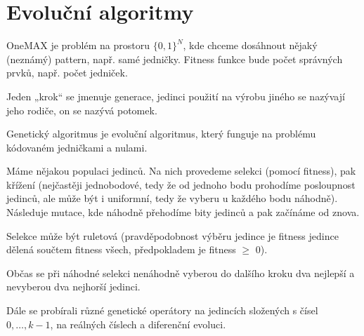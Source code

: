 \documentclass[12pt]{article}					%
\begin{document}

\section{Evoluční algoritmy}
\begin{definice}[OneMAX]
	OneMAX je problém na prostoru $\{0, 1\}^N$, kde chceme dosáhnout nějaký (neznámý) pattern, např. samé jedničky. Fitness funkce bude počet správných prvků, např. počet jedniček.
\end{definice}

\begin{definice}
	Jeden „krok“ se jmenuje generace, jedinci použití na výrobu jiného se nazývají jeho rodiče, on se nazývá potomek.
\end{definice}

\begin{definice}
	Genetický algoritmus je evoluční algoritmus, který funguje na problému kódovaném jedničkami a nulami.
	
	Máme nějakou populaci jedinců. Na nich provedeme selekci (pomocí fitness), pak křížení (nejčastěji jednobodové, tedy že od jednoho bodu prohodíme posloupnost jedinců, ale může být i uniformní, tedy že vyberu u každého bodu náhodně). Následuje mutace, kde náhodně přehodíme bity jedinců a pak začínáme od znova.

	Selekce může být ruletová (pravděpodobnost výběru jedince je fitness jedince dělená součtem fitness všech, předpokladem je fitness $≥$ 0).
\end{definice}

\begin{definice}[Elitismus]
	Občas se při náhodné selekci nenáhodně vyberou do dalšího kroku dva nejlepší a nevyberou dva nejhorší jedinci.
\end{definice}


Dále se probírali různé genetické operátory na jedincích složených s čísel $0, …, k-1$, na reálných číslech a diferenční evoluci.
\end{document}
